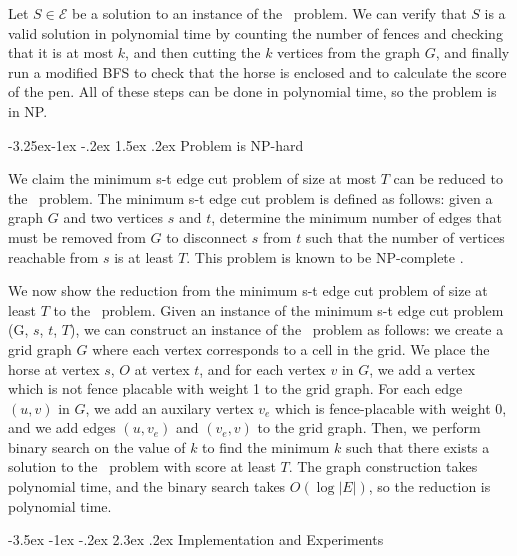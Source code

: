 \documentclass[sigconf,nonacm]{acmart}
\makeatletter
\renewcommand{\section}{\@startsection{section}{1}{\z@}%
  {-3.5ex \@plus -1ex \@minus -.2ex}%
  {2.3ex \@plus.2ex}%
  {\reset@font\Large\bfseries}}
\renewcommand{\subsection}{\@startsection{subsection}{2}{\z@}%
  {-3.25ex\@plus -1ex \@minus -.2ex}%
  {1.5ex \@plus .2ex}%
  {\reset@font\large\bfseries}}
\makeatother
\begin{document}
Let $S \in \mathcal{E}$ be a solution to an instance of the \horse\ problem. We can verify that $S$ is a valid solution in polynomial time by counting the number of fences and checking that it is at most $k$, and then cutting the $k$ vertices from the graph $G$, and finally run a modified BFS to check that the horse is enclosed and to calculate the score of the pen. All of these steps can be done in polynomial time, so the problem is in NP.

\subsection{Problem is NP-hard}

We claim the minimum s-t edge cut problem of size at most $T$ can be reduced to the \horse\ problem.
The minimum s-t edge cut problem is defined as follows: given a graph $G$ and two vertices $s$ and $t$, determine the minimum number of edges that must be removed from $G$ to disconnect $s$ from $t$ such that the number of vertices reachable from $s$ is at least $T$. This problem is known to be NP-complete \cite{CHEN2016434}.

We now show the reduction from the minimum s-t edge cut problem of size at least $T$ to the \horse\ problem. Given an instance of the minimum s-t edge cut problem (G, $s$, $t$, $T$), we can construct an instance of the \horse\ problem as follows: we create a grid graph $G$ where each vertex corresponds to a cell in the grid. We place the horse at vertex $s$, $O$ at vertex $t$, and for each vertex $v$ in $G$, we add a vertex which is not fence placable with weight 1 to the grid graph. For each edge $(u, v)$ in $G$, we add an auxilary vertex $v_e$ which is fence-placable with weight 0, and we add edges $(u, v_e)$ and $(v_e, v)$ to the grid graph. Then, we perform binary search on the value of $k$ to find the minimum $k$ such that there exists a solution to the \horse\ problem with score at least $T$. The graph construction takes polynomial time, and the binary search takes $O(\log |E|)$, so the reduction is polynomial time.

\section{Implementation and Experiments}

\end{document}
